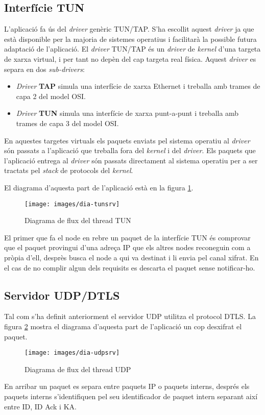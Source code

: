 \subsection{Interfície TUN}
L'aplicació fa ús del \emph{driver} genèric TUN/TAP. S'ha escollit aquest \emph{driver} ja que està disponible per la majoria de sistemes operatius i facilitarà la possible futura adaptació de l'aplicació.
El \emph{driver} TUN/TAP és un \emph{driver} de \emph{kernel} d'una targeta de xarxa virtual, i per tant no depèn del cap targeta real física. Aquest \emph{driver} es separa en dos \emph{sub-drivers}:
\begin{itemize}
\item \emph{Driver} \textbf{TAP} simula una interfície de xarxa Ethernet i treballa amb trames de capa 2 del model OSI.
\item \emph{Driver} \textbf{TUN} simula una interfície de xarxa punt-a-punt i treballa amb trames de capa 3 del model OSI.
\end{itemize}

En aquestes targetes virtuals els paquets enviats pel sistema operatiu al \emph{driver} són passats a l'aplicació que treballa fora del \emph{kernel} i del \emph{driver}. Els paquets que l'aplicació entrega al \emph{driver} són passats directament al sistema operatiu per a ser tractats pel \emph{stack} de protocols del \emph{kernel}.

El diagrama d'aquesta part de l'aplicació està en la figura \ref{F:dia-tunsrv}.
\begin{figure}[htb]
\centering
\texttt{[image: images/dia-tunsrv]}
\caption{Diagrama de flux del thread TUN}
\label{F:dia-tunsrv}
\end{figure}

El primer que fa el node en rebre un paquet de la interfície TUN és comprovar que el paquet provingui d'una adreça IP que els altres nodes reconeguin com a pròpia d'ell, desprès busca el node a qui va destinat i li envia pel canal xifrat. En el cas de no complir algun dels requisits es descarta el paquet sense notificar-ho.

\subsection{Servidor UDP/DTLS}
Tal com s'ha definit anteriorment el servidor UDP utilitza el protocol DTLS. La figura \ref{F:dia-udpsrv} mostra el diagrama d'aquesta part de l'aplicació un cop desxifrat el paquet.
\begin{figure}[htb]
\centering
\texttt{[image: images/dia-udpsrv]}
\caption{Diagrama de flux del thread UDP}
\label{F:dia-udpsrv}
\end{figure}
En arribar un paquet es separa entre paquets IP o paquets interns, després els paquets interns s'identifiquen pel seu identificador de paquet intern separant així entre ID, ID Ack i KA.

